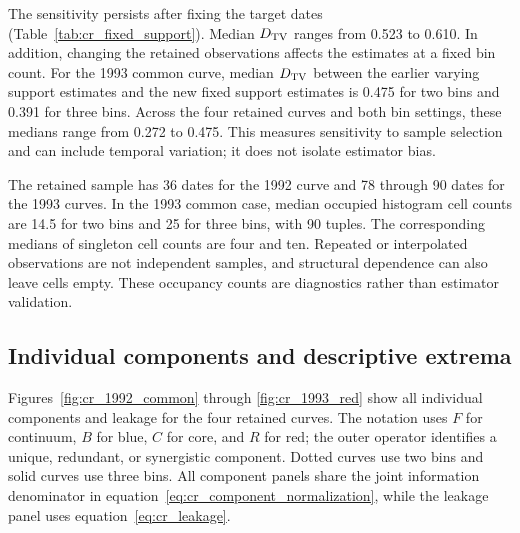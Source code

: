 \begin{table}[H]
\centering
\caption{Sensitivity between bin settings with identical target dates
across all positive lags. Every row has future continuum as the target.
Each median uses 30 base lags. The last column counts components whose
maximizing lag sets do not overlap between bin settings. All components,
including weak ones, are counted; ties are retained within absolute
tolerance $10^{-12}$.}
\label{tab:cr_fixed_support}
\small

\end{table}

The sensitivity persists after fixing the target dates
(Table~\ref{tab:cr_fixed_support}). Median $D_{\rm TV}$ ranges from
0.523 to 0.610. In addition, changing the retained observations affects the
estimates at a fixed bin count. For the 1993 common curve, median
$D_{\rm TV}$ between the earlier varying support estimates and the new fixed
support estimates is 0.475 for two bins and 0.391 for three bins.
Across the four retained curves and both bin settings, these medians range
from 0.272 to 0.475. This measures sensitivity to sample selection and can
include temporal variation; it does not isolate estimator bias.

The retained sample has 36 dates for the 1992 curve and 78 through 90
dates for the 1993 curves. In the 1993 common case, median occupied
histogram cell counts are 14.5 for two bins and 25 for three bins, with
90 tuples. The corresponding medians of singleton cell counts are four
and ten. Repeated or interpolated observations are not independent samples,
and structural dependence can also leave cells empty. These occupancy
counts are diagnostics rather than estimator validation.

\subsection{Individual components and descriptive extrema}

Figures~\ref{fig:cr_1992_common} through \ref{fig:cr_1993_red}
show all individual components and leakage for the four retained curves.
The notation uses $F$ for continuum, $B$ for blue, $C$ for core, and $R$
for red; the outer operator identifies a unique, redundant, or synergistic
component. Dotted curves use two bins and solid curves use three bins.
All component panels share the joint information denominator in
equation~\ref{eq:cr_component_normalization}, while the leakage panel uses
equation~\ref{eq:cr_leakage}.

